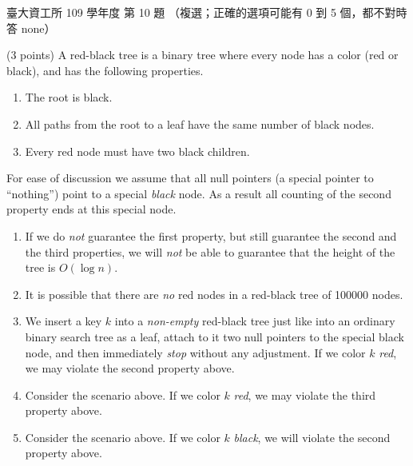 \begin{pastexam}[label={px:ntu-109-dsaa-10}]{臺大資工所 109 學年度 第 10 題}
（複選；正確的選項可能有 0 到 5 個，都不對時答 none）

(3 points) A red-black tree is a binary tree where every node has a color (red or black), and has
the following properties.
\begin{enumerate}[label=\arabic*.]
\item The root is black.
\item All paths from the root to a leaf have the same number of black nodes.
\item Every red node must have two black children.
\end{enumerate}
For ease of discussion we assume that all null pointers (a special pointer to ``nothing'') point
to a special \textit{black} node. As a result all counting of the second property ends at this
special node.
\begin{enumerate}[label=\arabic*.]
\item If we do \textit{not} guarantee the first property, but still guarantee the second and the
third properties, we will \textit{not} be able to guarantee that the height of the tree is
$O(\log n)$.
\item It is possible that there are \textit{no} red nodes in a red-black tree of 100000 nodes.
\item We insert a key $k$ into a \textit{non-empty} red-black tree just like into an ordinary
binary search tree as a leaf, attach to it two null pointers to the special black node, and then
immediately \textit{stop} without any adjustment. If we color $k$ \textit{red}, we may violate
the second property above.
\item Consider the scenario above. If we color $k$ \textit{red}, we may violate the third property
above.
\item Consider the scenario above. If we color $k$ \textit{black}, we will violate the second
property above.
\end{enumerate}
\end{pastexam}

